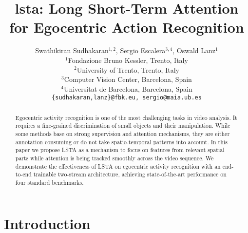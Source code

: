 \documentclass[10pt,twocolumn,letterpaper]{article}
\begin{document}
\title{\acs{lsta}: Long Short-Term Attention
for Egocentric Action Recognition}




\author{Swathikiran Sudhakaran$^{1,2}$, Sergio Escalera$^{3,4}$, Oswald Lanz$^{1}$\\ $^{1}$Fondazione Bruno Kessler, Trento, Italy\\
	$^{2}$University of Trento, Trento, Italy\\
	$^{3}$Computer Vision Center, Barcelona, Spain\\
	$^{4}$Universitat de Barcelona, Barcelona, Spain\\
	{\tt\small \{sudhakaran,lanz\}@fbk.eu, \tt\small sergio@maia.ub.es}
}

\maketitle


\begin{abstract}
Egocentric activity recognition is one of the most challenging tasks in video analysis. It requires a fine-grained discrimination of small objects and their manipulation. While some methods base on strong supervision and attention mechanisms, they are either annotation consuming or do not take spatio-temporal patterns into account. In this paper we propose LSTA as a mechanism to focus on features from relevant spatial parts while attention is being tracked smoothly across the video sequence. We demonstrate the effectiveness of LSTA on egocentric activity recognition with an end-to-end trainable two-stream architecture, achieving state-of-the-art performance on four standard benchmarks.

\end{abstract}

\vspace{-0.5cm}
\section{Introduction}
\end{document}
